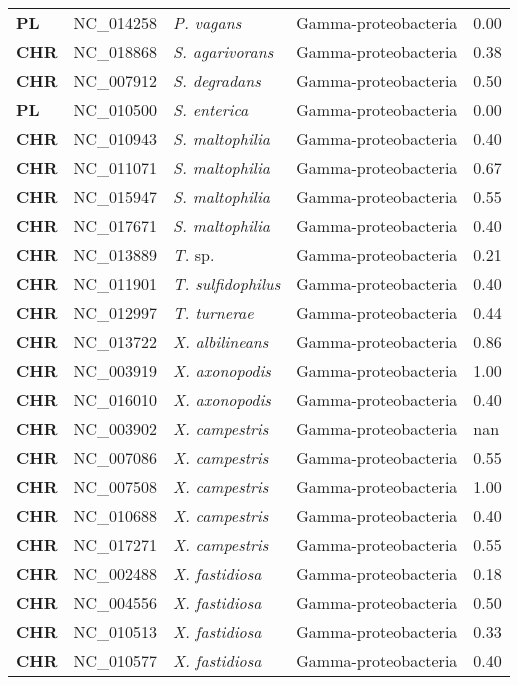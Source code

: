 \begin{adjustwidth}{-3cm}{2cm}
{\begin{supertabular}{>{\bfseries}l|p{0.1\textwidth}p{0.14\textwidth}l|l}
PL & NC\_014258 & \textit{P. vagans} & Gamma-proteobacteria & 0.00\\
CHR & NC\_018868 & \textit{S. agarivorans} & Gamma-proteobacteria & 0.38\\
CHR & NC\_007912 & \textit{S. degradans} & Gamma-proteobacteria & 0.50\\
PL & NC\_010500 & \textit{S. enterica} & Gamma-proteobacteria & 0.00\\
CHR & NC\_010943 & \textit{S. maltophilia} & Gamma-proteobacteria & 0.40\\
CHR & NC\_011071 & \textit{S. maltophilia} & Gamma-proteobacteria & 0.67\\
CHR & NC\_015947 & \textit{S. maltophilia} & Gamma-proteobacteria & 0.55\\
CHR & NC\_017671 & \textit{S. maltophilia} & Gamma-proteobacteria & 0.40\\
CHR & NC\_013889 & \textit{T. }sp. & Gamma-proteobacteria & 0.21\\
CHR & NC\_011901 & \textit{T. sulfidophilus} & Gamma-proteobacteria & 0.40\\
CHR & NC\_012997 & \textit{T. turnerae} & Gamma-proteobacteria & 0.44\\
CHR & NC\_013722 & \textit{X. albilineans} & Gamma-proteobacteria & 0.86\\
CHR & NC\_003919 & \textit{X. axonopodis} & Gamma-proteobacteria & 1.00\\
CHR & NC\_016010 & \textit{X. axonopodis} & Gamma-proteobacteria & 0.40\\
CHR & NC\_003902 & \textit{X. campestris} & Gamma-proteobacteria & nan\\
CHR & NC\_007086 & \textit{X. campestris} & Gamma-proteobacteria & 0.55\\
CHR & NC\_007508 & \textit{X. campestris} & Gamma-proteobacteria & 1.00\\
CHR & NC\_010688 & \textit{X. campestris} & Gamma-proteobacteria & 0.40\\
CHR & NC\_017271 & \textit{X. campestris} & Gamma-proteobacteria & 0.55\\
CHR & NC\_002488 & \textit{X. fastidiosa} & Gamma-proteobacteria & 0.18\\
CHR & NC\_004556 & \textit{X. fastidiosa} & Gamma-proteobacteria & 0.50\\
CHR & NC\_010513 & \textit{X. fastidiosa} & Gamma-proteobacteria & 0.33\\
CHR & NC\_010577 & \textit{X. fastidiosa} & Gamma-proteobacteria & 0.40\\

\end{supertabular}}
\end{adjustwidth}

